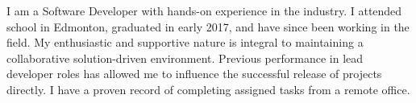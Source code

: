 I am a Software Developer with hands-on experience in the industry. 
I attended school in Edmonton, graduated in early 2017, and have since been working in the field. 
My enthusiastic and supportive nature is integral to maintaining a collaborative solution-driven environment.
Previous performance in lead developer roles has allowed me to influence the successful release of projects directly. 
I have a proven record of completing assigned tasks from a remote office.